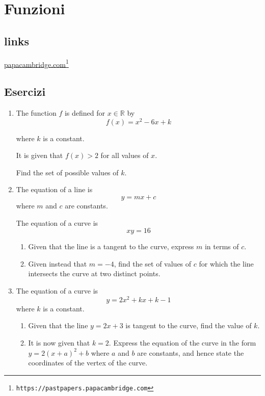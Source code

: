 \section{Funzioni} \label{sec:funzioni}

\subsection{links}


\href{https://pastpapers.papacambridge.com}{papacambridge.com}\footnote{\texttt{https://pastpapers.papacambridge.com}}


\subsection{Esercizi}

\begin{enumerate}
\item  
The function $f$ is defined for $x \in \mathbb{R}$
by 
\[
f(x) = x^2 - 6x + k
\]

where $k$ is a constant.

It is given that $f(x) > 2$ for all values of $x$.

Find the set of possible values of $k$.




\item
The equation of a line is \[ y = mx + c \] where $m$ and $c$ are constants.

The equation of a curve is \[ xy = 16 \]

\begin{enumerate}
\item Given that the line is a tangent to the curve, express $m$ in terms of $c$.
\item Given instead that $m = -4$, find the set of values of $c$ for which the line 
intersects the curve at two distinct points.
\end{enumerate}


\item
The equation of a curve is \[ y=2x^2 + kx + k - 1 \] where $k$ is a constant.

\begin{enumerate}
\item Given that the line $y=2x+3$ is tangent to the curve, find the value of $k$.
\item It is now given that $k=2$.  Express the equation of the curve in the form $y=2(x+a)^2+b$
where $a$ and $b$ are constants, and hence state the coordinates of the vertex of the curve.
\end{enumerate}


\end{enumerate}


